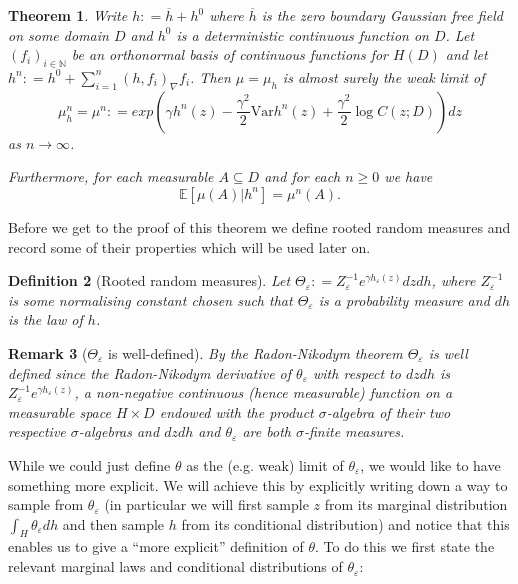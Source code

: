 \documentclass[11pt,reqno]{amsart}
\numberwithin{equation}{section}
\newtheorem{thm}{Theorem}[section]
\newtheorem{defi}[thm]{Definition}
\newtheorem{rem}[thm]{Remark}
\newcommand{\deq}{\mathrel{\mathop:}=}
\newcommand{\eps}{\varepsilon}
\begin{document}
\begin{thm}\label{thm:approximationofhwithhn}
	Write $h\deq \overline h+h^0$ where $\overline h$ is the zero boundary Gaussian free field on some domain $D$ and $h^0$ is a deterministic continuous function on $D$. Let $(f_i)_{i\in\mathbb N}$ be an orthonormal basis of continuous functions for $H(D)$ and let $h^n\deq h^0+\sum_{i=1}^n (h,f_i)_\nabla f_i$. Then $\mu=\mu_h$ is almost surely the weak limit of $$\mu_h^n=\mu^n\deq exp\left(\gamma h^n(z)-\frac{\gamma^2}{2}\text{Var}h^n(z)+\frac{\gamma^2}{2}\log C(z;D) \right)dz$$
	as $n\rightarrow\infty$.
	
	Furthermore, for each measurable $A\subseteq D$ and for each $n\geq 0$ we have $$\mathbb E[\mu(A)|h^n]=\mu^n(A).$$
\end{thm}

Before we get to the proof of this theorem we define rooted random measures and record some of their properties which will be used later on.

\begin{defi}[Rooted random measures]
	Let $\Theta_\eps\deq Z^{-1}_\eps e^{\gamma h_\eps(z)}dzdh$, where $Z^{-1}_\eps$ is some normalising constant chosen such that $\Theta_\eps$ is a probability measure and $dh$ is the law of $h$.
\end{defi}
\begin{rem}[$\Theta_\eps$ is well-defined]
	By the Radon-Nikodym theorem $\Theta_\eps$ is well defined since the Radon-Nikodym derivative of $\theta_\eps$ with respect to $dzdh$ is $Z^{-1}_\eps e^{\gamma h_\eps(z)}$, a non-negative continuous (hence measurable) function on a measurable space $H\times D$ endowed with the product $\sigma$-algebra of their two respective $\sigma$-algebras and $dzdh$ and $\theta_\eps$ are both $\sigma$-finite measures.
\end{rem}

While we could just define $\theta$ as the (e.g. weak) limit of $\theta_\eps$, we would like to have something more explicit. We will achieve this by explicitly writing down a way to sample from $\theta_\eps$ (in particular we will first sample $z$ from its marginal distribution $\int_H\theta_\eps dh$ and then sample $h$ from its conditional distribution) and notice that this enables us to give a ``more explicit'' definition of $\theta$.
To do this we first state the relevant marginal laws and conditional distributions of $\theta_\eps$:
\end{document}

